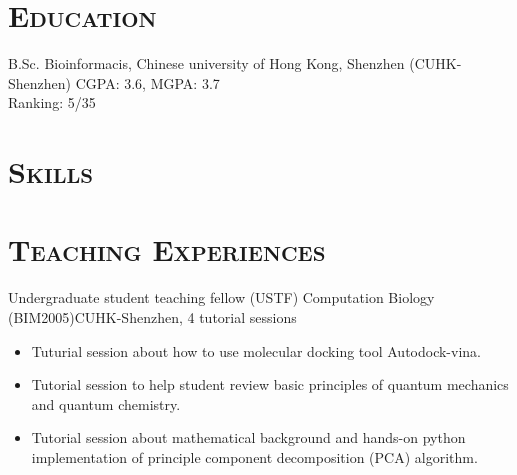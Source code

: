 \documentclass[11pt,a4paper]{moderncv}
\newcommand{\cvsection}[1]{\section{\textsc{#1}}}
\begin{document}
\maketitle

\cvsection{Education}
        {B.Sc.}
        {}
        {Bioinformacis, Chinese university of Hong Kong, Shenzhen (CUHK-Shenzhen)}
        {}
        {CGPA: 3.6, MGPA: 3.7\\Ranking: 5/35}

\cvsection{Skills}

\cvsection{Teaching Experiences}
        {Undergraduate student teaching fellow (USTF)}{}
        {Computation Biology (BIM2005)}{CUHK-Shenzhen, 4 tutorial sessions}
        {
            \begin{itemize}
                \item Tuturial session about how to use molecular docking tool Autodock-vina.
                \item Tutorial session to help student review basic principles of quantum mechanics and quantum chemistry.
                \item Tutorial session about mathematical background and hands-on python implementation of principle component decomposition (PCA) algorithm.
            \end{itemize}
        }
\end{document}
